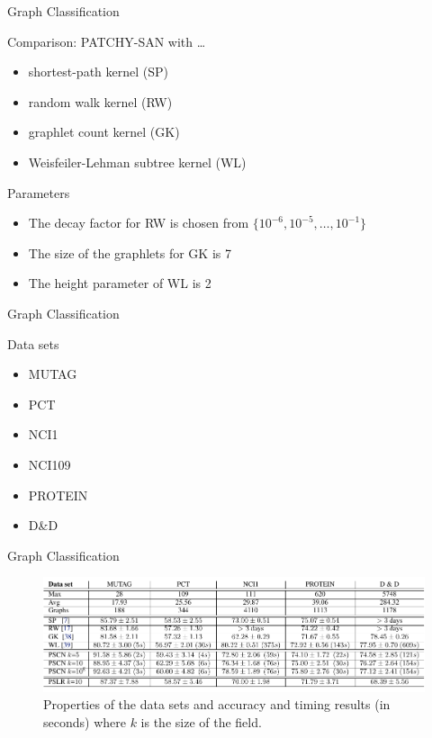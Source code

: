 \documentclass[dvipdfmx]{beamer}
\begin{document}
  \begin{frame}{Graph Classification}
    \begin{block}{Comparison: PATCHY-SAN with \dots}
      \begin{itemize}
        \item shortest-path kernel (SP)
        \item random walk kernel (RW)
        \item graphlet count kernel (GK)
        \item Weisfeiler-Lehman subtree kernel (WL)
      \end{itemize}
    \end{block}

    \begin{exampleblock}{Parameters}
      \begin{itemize}
        \item The decay factor for RW is chosen from $\{10^{-6}, 10^{-5}, \dots, 10^{-1}\}$
        \item The size of the graphlets for GK is 7
        \item The height parameter of WL is 2
      \end{itemize}
    \end{exampleblock}
  \end{frame}

  \begin{frame}{Graph Classification}
    \begin{block}{Data sets}
      \begin{itemize}
        \item MUTAG
        \item PCT
        \item NCI1
        \item NCI109
        \item PROTEIN
        \item D\&D 
      \end{itemize}
    \end{block}
  \end{frame}

  \begin{frame}{Graph Classification}
    \begin{figure}[h]
      \centering
      \includegraphics[width=0.8\paperwidth]{img/Table1.pdf}
      \caption{Properties of the data sets and accuracy and timing results (in seconds) where $k$ is the size of the field.}
    \end{figure} 
  \end{frame}
\end{document}
